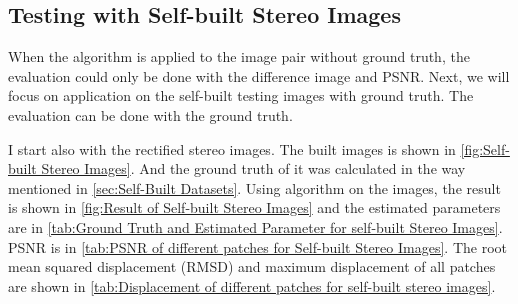 \subsection{Testing with Self-built Stereo Images}\label{subsec:Testing with Self-built Stereo Images}
When the algorithm is applied to the image pair without ground truth, the evaluation could only be done with the difference image and PSNR. Next, we will focus on application on the self-built testing images with ground truth. The evaluation can be done with the ground truth.

I start also with the rectified stereo images. The built images is shown in \cref{fig:Self-built Stereo Images}. And the ground truth of it was calculated in the way mentioned in \cref{sec:Self-Built Datasets}. Using algorithm on the images, the result is shown in \cref{fig:Result of Self-built Stereo Images} and the estimated parameters are in \cref{tab:Ground Truth and Estimated Parameter for self-built Stereo Images}. PSNR is in \cref{tab:PSNR of different patches for Self-built Stereo Images}. The root mean squared displacement (RMSD) and maximum displacement of all patches are shown in \cref{tab:Displacement of different patches for self-built stereo images}.

